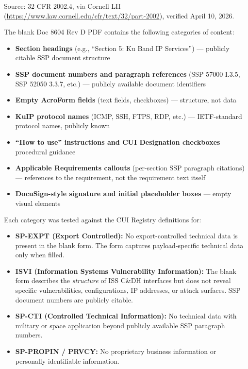 {\begin{enumerate}
Source: 32 CFR 2002.4, via Cornell LII (\url{https://www.law.cornell.edu/cfr/text/32/part-2002}), verified April 10, 2026.


The blank Doc 8604 Rev D PDF contains the following categories of content:

\begin{itemize}
    \item \textbf{Section headings} (e.g., ``Section 5: Ku Band IP Services'') --- publicly citable SSP document structure
    \item \textbf{SSP document numbers and paragraph references} (SSP 57000 I.3.5, SSP 52050 3.3.7, etc.) --- publicly available document identifiers
    \item \textbf{Empty AcroForm fields} (text fields, checkboxes) --- structure, not data
    \item \textbf{KuIP protocol names} (ICMP, SSH, FTPS, RDP, etc.) --- IETF-standard protocol names, publicly known
    \item \textbf{``How to use'' instructions and CUI Designation checkboxes} --- procedural guidance
    \item \textbf{Applicable Requirements callouts} (per-section SSP paragraph citations) --- references to the requirement, not the requirement text itself
    \item \textbf{DocuSign-style signature and initial placeholder boxes} --- empty visual elements
\end{itemize}

Each category was tested against the CUI Registry definitions for:

\begin{itemize}
    \item \textbf{SP-EXPT (Export Controlled):} No export-controlled technical data is present in the blank form. The form captures payload-specific technical data only when filled.
    \item \textbf{ISVI (Information Systems Vulnerability Information):} The blank form describes the \textit{structure} of ISS C\&DH interfaces but does not reveal specific vulnerabilities, configurations, IP addresses, or attack surfaces. SSP document numbers are publicly citable.
    \item \textbf{SP-CTI (Controlled Technical Information):} No technical data with military or space application beyond publicly available SSP paragraph numbers.
    \item \textbf{SP-PROPIN / PRVCY:} No proprietary business information or personally identifiable information.
\end{itemize}


\end{enumerate}}
